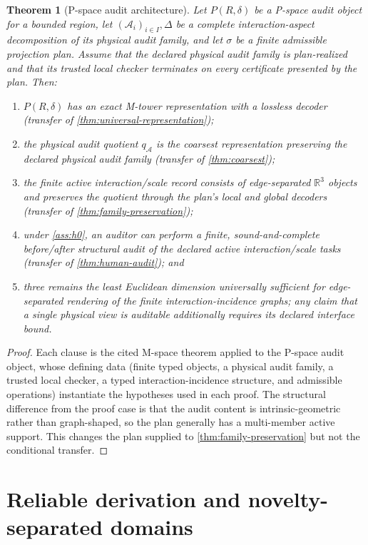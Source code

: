 \documentclass[11pt]{article}
\newcommand{\R}{\mathbb R}
\newcommand{\qA}{q_{\mathcal A}}
\newcommand{\mcA}{\mathcal A}
\theoremstyle{plain}
\newtheorem{theorem}{Theorem}[section]
\theoremstyle{definition}
\theoremstyle{remark}
\begin{document}
\begin{theorem}[P-space audit architecture]
\label{thm:pspace}
Let $P(R,\delta)$ be a P-space audit object for a bounded region, let
$(\mcA_i)_{i\in I},\Delta$ be a complete interaction-aspect decomposition of its
physical audit family, and let $\sigma$ be a finite admissible projection plan.
Assume that the declared physical audit family is plan-realized and that its
trusted local checker terminates on every certificate presented by the plan.
Then:
\begin{enumerate}
    \item $P(R,\delta)$ has an exact M-tower representation with a lossless decoder (transfer of \cref{thm:universal-representation});
    \item the physical audit quotient $\qA$ is the coarsest representation preserving the declared physical audit family (transfer of \cref{thm:coarsest});
    \item the finite active interaction/scale record consists of edge-separated $\R^3$ objects and preserves the quotient through the plan's local and global decoders (transfer of \cref{thm:family-preservation});
    \item under \cref{ass:h0}, an auditor can perform a finite, sound-and-complete before/after structural audit of the declared active interaction/scale tasks (transfer of \cref{thm:human-audit}); and
    \item three remains the least Euclidean dimension universally sufficient for edge-separated rendering of the finite interaction-incidence graphs; any claim that a single physical view is auditable additionally requires its declared interface bound.
\end{enumerate}
\end{theorem}

\begin{proof}
Each clause is the cited M-space theorem applied to the P-space audit object,
whose defining data (finite typed objects, a physical audit family, a trusted
local checker, a typed interaction-incidence structure, and admissible
operations) instantiate the hypotheses used in each proof.  The structural
difference from the proof case is that the audit content is
intrinsic-geometric rather than graph-shaped, so the plan generally has a
multi-member active support.  This changes the plan supplied to
\cref{thm:family-preservation} but not the conditional transfer.
\end{proof}

\section{Reliable derivation and novelty-separated domains}
\label{sec:necessity}
\end{document}
